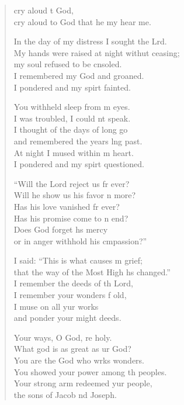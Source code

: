 \settowidth{\versewidth}{My hands were raised at night without ceasing; *}
\begin{verse}%
  \begin{patverse}
     cry aloud t God,\Med\\
cry aloud to God that he my hear me.

In the day of my distress I sought the Lrd.\Flex\\
My hands were raised at night withut ceasing;\Med\\
my soul refused to be cnsoled.\\
I remembered my God and  groaned.\Med\\
I pondered and my spir\pointup{\i}t fainted.

You withheld sleep from m eyes.\Med\\
I was troubled, I could nt speak.\\
I thought of the days of long go\Med\\
and remembered the years lng past.\\
At night I mused within m heart.\Med\\
I pondered and my spir\pointup{\i}t questioned.

“Will the Lord reject us fr ever?\Med\\
Will he show us his favor n more?\\
Has his love vanished fr ever?\Med\\
Has his promise come to n end?\\
Does God forget h\pointup{\i}s mercy\Med\\
or in anger withhold his cmpassion?”

I said: “This is what causes m grief;\Med\\
that the way of the Most High hs changed.”\\
I remember the deeds of th Lord,\Med\\
I remember your wonders f old,\\
I muse on all yur works\Med\\
and ponder your might deeds.

Your ways, O God, re holy.\Med\\
What god is as great as ur God?\\
You are the God who wrks wonders.\Med\\
You showed your power among th peoples.\\
Your strong arm redeemed yur people,\Med\\
the sons of Jacob nd Joseph.


\end{patverse}
\end{verse}
